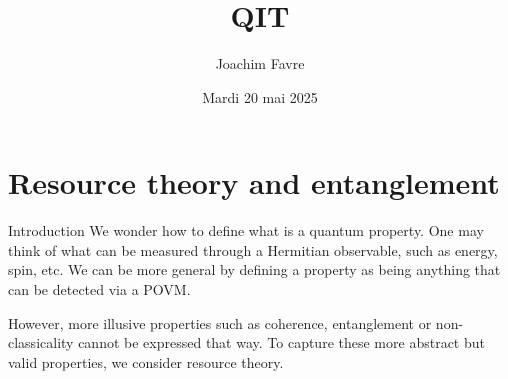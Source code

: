 \documentclass[a4paper]{article}
\title{QIT}
\author{Joachim Favre}
\date{Mardi 20 mai 2025}
\begin{document}
\maketitle


\section{Resource theory and entanglement}

\begin{parag}{Introduction}
    We wonder how to define what is a quantum property. One may think of what can be measured through a Hermitian observable, such as energy, spin, etc. We can be more general by defining a property as being anything that can be detected via a POVM.

    However, more illusive properties such as coherence, entanglement or non-classicality cannot be expressed that way. To capture these more abstract but valid properties, we consider resource theory.  
\end{parag}
\end{document}
